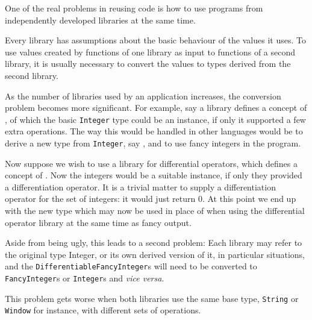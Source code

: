 
One of the real problems in reusing code is
how to use programs from independently developed libraries at the same time.

Every library has assumptions about the basic behaviour of the values it uses.
To use values created by functions of one library as input to 
functions of a second library, it is usually necessary
to convert the values to types derived from the second library.

As the number of libraries used by an application increases, the conversion
problem becomes more significant.  
%
For example, say a library defines a concept of
, of which the basic {\tt Integer} type could be an instance,
if only it supported a few extra operations.
The way this would be handled in other languages would be to derive a
new type from {\tt Integer}, say , and to use
fancy integers in the program.

Now suppose we wish to use a library for differential operators,
which defines a concept of .
Now the integers would be a suitable instance, if only they provided
a differentiation operator.  It is a trivial matter to supply a
differentiation operator for the set of integers:  it would just return 0.
At this point we end up with the new type
 which may now be used in place of 
 when using the differential operator library at the
same time as fancy output. 

Aside from being ugly,  this leads to a second problem:
Each library may refer to the original type Integer, or its own
derived version of it, in particular situations, and the 
{\tt DifferentiableFancyInteger}s will need to be converted to {\tt
FancyInteger}s or {\tt Integer}s and {\em vice versa}.

This problem gets worse when both libraries use the same base type,
{\tt String} or {\tt Window} for instance, with different sets of operations.


